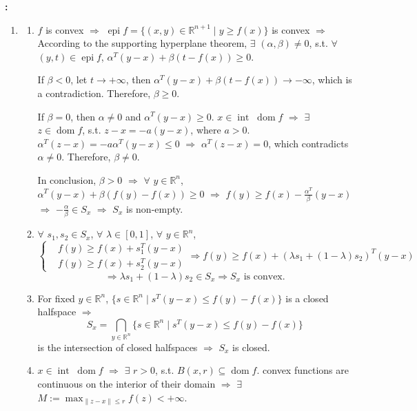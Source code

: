 \documentclass[11pt,letter,notitlepage]{article}
\theoremstyle{definition}
\begin{document}
\begin{solution}\textbf{:}
\begin{enumerate}
    \item[(a)]
    \begin{enumerate}
        \item[\ding{172}] $f$ is convex $\Longrightarrow$ $\operatorname{epi} f = \{(x,y) \in \mathbb{R}^{n+1} \mid y \ge f(x)\}$ is convex $\Longrightarrow$ According to the supporting hyperplane theorem, $\exists$ $(\alpha, \beta) \neq 0$, s.t. $\forall$ $(y,t) \in \operatorname{epi} f$, $\alpha^T (y-x) + \beta (t - f(x)) \ge 0$.

        If $\beta < 0$, let $t \to +\infty$, then $\alpha^T (y-x) + \beta (t - f(x)) \to -\infty$, which is a contradiction. Therefore, $\beta \geq 0$.
        
        If $\beta = 0$, then $\alpha \neq 0$ and $\alpha^T (y-x) \ge 0$. $x \in \operatorname{int}\;\operatorname{dom} f$ $\Longrightarrow$ $\exists$ $z \in \operatorname{dom} f$, s.t. $z-x = -a (y-x)$, where $a > 0$. $\alpha^T (z-x) = -a \alpha^T (y-x) \le 0$ $\Longrightarrow$ $\alpha^T (z-x) = 0$, which contradicts $\alpha \neq 0$. Therefore, $\beta \neq 0$.

        In conclusion, $\beta > 0$ $\Longrightarrow$ $\forall$ $y \in \mathbb{R}^n$, $\alpha ^T (y-x) + \beta (f(y) - f(x)) \ge 0$ $\Longrightarrow$ $f(y) \geq f(x) - \frac{\alpha^T}{\beta} (y-x)$ $\Longrightarrow$ $-\frac{\alpha}{\beta} \in S_x$ $\Longrightarrow$ $S_x$ is non-empty.
        \item[\ding{173}] $\forall$ $s_1, s_2 \in S_x$, $\forall$ $\lambda \in [0,1]$, $\forall$ $y \in \mathbb{R}^n$,
        $$
        \left\{
        \begin{aligned}
        &f(y) \ge f(x) + s_1^T (y-x)\\
        &f(y) \ge f(x) + s_2^T (y-x)
        \end{aligned}
        \right.
        \Longrightarrow
        f(y) \ge f(x) + (\lambda s_1 + (1-\lambda) s_2)^T (y-x)
        $$
        $$
        \Longrightarrow
        \lambda s_1 + (1-\lambda) s_2 \in S_x 
        \Longrightarrow 
        S_x \text{ is convex.}
        $$
        \item[\ding{174}] For fixed $y \in \mathbb{R}^n$, $\{s \in \mathbb{R}^n \mid s^T (y-x) \le f(y) - f(x)\}$ is a closed halfspace $\Longrightarrow$
        $$
        S_x = \bigcap_{y \in \mathbb{R}^n} \{s \in \mathbb{R}^n \mid s^T (y-x) \le f(y) - f(x)\}
        $$
        is the intersection of closed halfspaces $\Longrightarrow$ $S_x$ is closed.
        \item[\ding{175}] $x \in \operatorname{int}\;\operatorname{dom} f$ $\Longrightarrow$ $\exists$ $r > 0$, s.t. $B(x,r) \subseteq \operatorname{dom} f$. convex functions are continuous on the interior of their domain $\Longrightarrow$ $\exists$ $M :=\max_{\|z-x\| \leq r} f(z) < +\infty$.
        

\end{enumerate}
\end{enumerate}
\end{solution}
\end{document}
